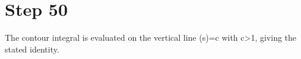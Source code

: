 \section*{Step 50}

The contour integral is evaluated on the vertical line \Re(s)=c with c>1, giving the stated identity.
